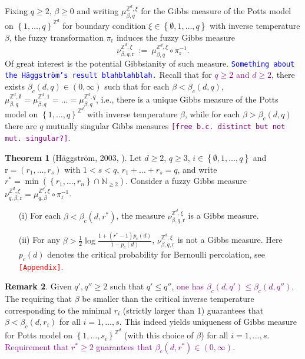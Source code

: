 \documentclass[12pt]{article}
\newcommand{\N}{\mathbb{N}}
\renewcommand{\r}{\mathrm{r}}
\newcommand{\Z}{\mathbb{Z}}
\newcommand{\set}[1]{\left\{#1\right\}}
\newcommand{\1}{\mathbbm{1}}
\newcommand{\5}{\vspace{0.5cm}}
\theoremstyle{definition}
\newtheorem{thm}{Theorem}[section]
\newtheorem{rem}[thm]{Remark}
\begin{document}
Fixing $q\geq 2$, $\beta\geq 0$ and writing $\mu_{\beta,q}^{\Z^d,\xi}$ for the Gibbs measure of the Potts model on $\set{1,\ldots,q}^{\Z^d}$ for boundary condition $\xi\in\set{\emptyset,1,\ldots,q}$ with inverse temperature $\beta$, the fuzzy transformation $\pi_\r$ induces the fuzzy Gibbs measure 
$$\nu_{\beta,q,\r}^{\Z^d,\xi} ~:=~ \mu_{\beta,q}^{\Z^d,\xi}\circ\pi_\r^{-1}.$$
Of great interest is the potential Gibbsianity of such measure. \textcolor{blue}{\texttt{Something about the H\"aggstr\"om's result blahblahblah.}} Recall that for \textcolor{purple}{$q\geq 2$ and $d\geq 2$}, there exists $\beta_c(d,q)\in(0,\infty)$ such that for each $\beta<\beta_c(d,q)$, $\mu_{\beta,q}^{\Z^d,\emptyset}=\mu_{\beta,q}^{\Z^d,1}=\ldots=\mu_{\beta,q}^{\Z^d,q}$, i.e., there is a unique Gibbs measure of the Potts model on $\set{1,\ldots,q}^{\Z^d}$ with inverse temperature $\beta$, while for each $\beta>\beta_c(d,q)$ there are $q$ mutually singular Gibbs measures \textcolor{purple}{\texttt{[free b.c.~distinct but not mut.~singular?]}}.

\begin{thm}[H\"aggstr\"om, 2003, \cite{Hag}]\label{Haggstrom}
Let $d\geq 2$, $q\geq 3$, $i\in\set{\emptyset,1,\ldots,q}$ and $\r=(r_1,\ldots,r_s)$ with $1<s<q$, $r_1+\ldots+r_s=q$, and write $r^*=\min(\set{r_1,\ldots,r_n}\cap\N_{\geq 2})$. Consider a fuzzy Gibbs measure $\nu_{q,\beta,\r}^{\Z^d,\xi}=\mu_{q,\beta}^{\Z^d,\xi}\circ\pi_{\r}^{-1}$.
\begin{itemize}
	\item[(i)] For each $\beta<\beta_c(d,r^*)$, the measure $\nu_{\beta,q,\r}^{\Z^d,\xi}$ is a Gibbs measure.
	\item[(ii)] For any $\beta>\frac{1}{2}\log\frac{1+(r^*-1)p_c(d)}{1-p_c(d)}$, $\nu_{\beta,q,\r}^{\Z^d,\xi}$ is not a Gibbs measure. Here $p_c(d)$ denotes the critical probability for Bernoulli percolation, see \textcolor{red}{\texttt{[Appendix]}}.
\end{itemize}
\end{thm}

\begin{rem}
Given $q',q''\geq 2$ such that $q'\leq q''$, \textcolor{purple}{one has $\beta_c(d,q')\leq\beta_c(d,q'')$}. The requiring that $\beta$ be smaller than the critical inverse temperature corresponding to the minimal $r_i$ (strictly larger than 1) guarantees that $\beta<\beta_c(d,r_i)$ for all $i=1,\ldots,s$. This indeed yields uniqueness of Gibbs measure for Potts model on $\set{1,\ldots,s_i}^{\Z^d}$ (with this choice of $\beta$) for all $i=1,\ldots,s$. \textcolor{purple}{Requirement that $r^*\geq 2$ guarantees that $\beta_c(d,r^*)\in(0,\infty)$.}
\end{rem}
\end{document}
